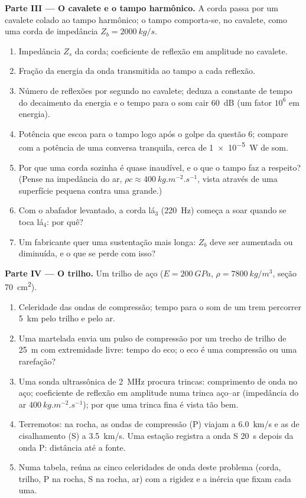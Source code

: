 \begin{problem}
\medskip
\noindent\textbf{Parte III --- O cavalete e o tampo harmônico.}
A corda passa por um cavalete colado ao tampo harmônico; o tampo
comporta-se, no cavalete, como uma corda de impedância $Z_b = \qty{2000}{kg/s}$.
\begin{enumerate}[resume]
  \item Impedância $Z_s$ da corda; coeficiente de reflexão em amplitude
        no cavalete.
  \item Fração da energia da onda transmitida ao tampo a
        cada reflexão.
  \item Número de reflexões por segundo no cavalete; deduza a constante
        de tempo do decaimento da energia e o tempo para o som cair
        \qty{60}{dB} (um fator $10^6$ em energia).
  \item Potência que escoa para o tampo logo após o golpe da
        questão 6; compare com a potência de uma conversa tranquila,
        cerca de \qty{1e-5}{W} de som.
  \item Por que uma corda sozinha é quase inaudível, e o que o
        tampo faz a respeito? (Pense na impedância do ar,
        $\rho c \approx \qty{400}{kg.m^{-2}.s^{-1}}$, vista através de uma superfície
        pequena contra uma grande.)
  \item Com o abafador levantado, a corda lá$_3$ (\qty{220}{Hz}) começa a
        soar quando se toca lá$_4$: por quê?
  \item Um fabricante quer uma sustentação mais longa: $Z_b$ deve ser aumentada ou
        diminuída, e o que se perde com isso?
\end{enumerate}

\medskip
\noindent\textbf{Parte IV --- O trilho.}
Um trilho de aço ($E = \qty{200}{GPa}$, $\rho = \qty{7800}{kg/m^3}$, seção
\qty{70}{cm^2}).
\begin{enumerate}[resume]
  \item Celeridade das ondas de compressão; tempo para o som de um trem
        percorrer \qty{5}{km} pelo trilho e pelo ar.
  \item Uma martelada envia um pulso de compressão por um trecho de trilho de
        \qty{25}{m} com extremidade livre: tempo do eco; o eco é uma
        compressão ou uma rarefação?
  \item Uma sonda ultrassônica de \qty{2}{MHz} procura trincas: comprimento de onda no
        aço; coeficiente de reflexão em amplitude numa trinca aço--ar
        (impedância do ar $\qty{400}{kg.m^{-2}.s^{-1}}$); por que uma trinca
        fina é vista tão bem.
  \item Terremotos: na rocha, as ondas de compressão (P) viajam a
        \qty{6.0}{km/s} e as de cisalhamento (S) a \qty{3.5}{km/s}. Uma estação
        registra a onda S \qty{20}{s} depois da onda P: distância até a
        fonte.
  \item Numa tabela, reúna as cinco celeridades de onda deste problema
        (corda, trilho, P na rocha, S na rocha, ar) com a rigidez e a
        inércia que fixam cada uma.
\end{enumerate}
\end{problem}
